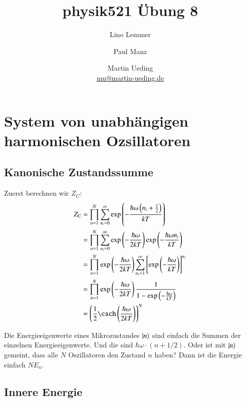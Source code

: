 

\title{physik521 Übung 8}
\author{
    Lino Lemmer
    \and
    Paul Manz
    \and
    Martin Ueding \\ {\small \href{mailto:mu@martin-ueding.de}{mu@martin-ueding.de}}
}



\maketitle

\newcommand\ZC{Z_\text C}

\section{System von unabhängigen harmonischen Ozsillatoren}

\subsection{Kanonische Zustandssumme}

Zuerst berechnen wir $Z_C$:
\begin{align*}
    Z_\text C
    &= \prod_{n=1}^N \sum_{n_i=0}^\infty \exp\del{- \frac{\hbar\omega \del{n_i + \frac 12}}{kT}} \\
    &= \prod_{n=1}^N \sum_{n_i=0}^\infty \exp\del{- \frac{\hbar\omega}{2kT}} \exp\del{- \frac{\hbar\omega n_i}{kT}} \\
    &= \prod_{n=1}^N \exp\del{- \frac{\hbar\omega}{2kT}} \sum_{n_i=1}^\infty \sbr{\exp\del{- \frac{\hbar\omega}{kT}}}^{n_i} \\
    &= \prod_{n=1}^N \exp\del{- \frac{\hbar\omega}{2kT}} \frac1{1 - \exp\del{- \frac{\hbar\omega}{kT}}} \\
    &= \del{\frac 12 \csch\del{\frac{\hbar\omega}{2kT}}}^N
\end{align*}

Die Energieeigenwerte eines Mikrozustandes $\left|n\right\rangle$ sind einfach die Summen der einzelnen Energieeigenwerte. Und die sind $\hbar\omega\cdot(n + 1/2)$. Oder ist mit $\left|n\right\rangle$ gemeint, dass alle $N$ Oszillatoren den Zustand $n$ haben? Dann ist die Energie einfach $N E_n$.

\subsection{Innere Energie}

